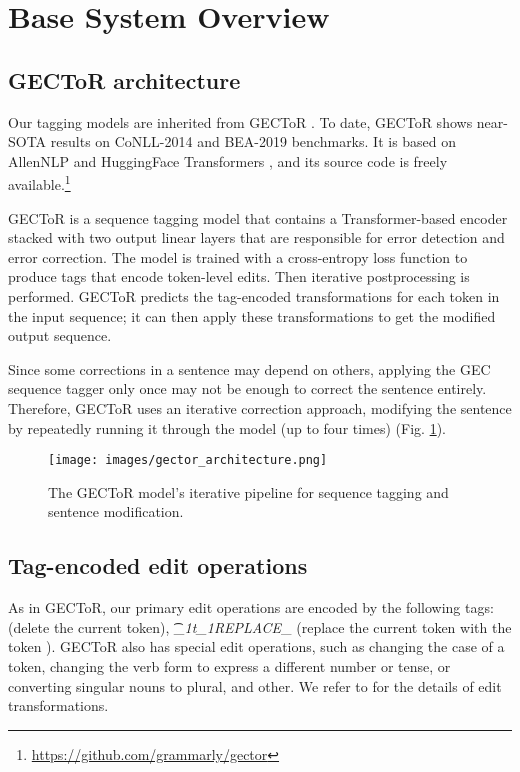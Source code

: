 \documentclass[11pt]{article}
\begin{document}
\section{Base System Overview}
\subsection{GECToR architecture} 
Our tagging models are inherited from GECToR \cite{omelianchuk2020gector}. To date, GECToR shows near-SOTA results on CoNLL-2014 and BEA-2019 benchmarks. It is based on AllenNLP \cite{Gardner2017AllenNLP} and  HuggingFace Transformers \cite{wolf2019huggingface}, and its source code is freely available.\footnote{\url{https://github.com/grammarly/gector}}

GECToR is a sequence tagging model that contains a Transformer-based encoder stacked with two output linear layers that are responsible for error detection and error correction. The model is trained with a cross-entropy loss function to produce tags that encode token-level edits. Then iterative postprocessing is performed. GECToR predicts the tag-encoded transformations for each token in the input sequence; it can then apply these transformations to get the modified output sequence. 

Since some corrections in a sentence may depend on others, applying the GEC sequence tagger only once may not be enough to correct the sentence entirely. Therefore, GECToR uses an iterative correction approach, modifying  the sentence by repeatedly running it through the model (up to four times) (Fig. \ref{fig_gector}).

\begin{figure}[!h]
\centering
\texttt{[image: images/gector\_architecture.png]} 
\caption{The GECToR model's iterative pipeline for sequence tagging and sentence modification.} \label{fig_gector}
\end{figure}

\subsection{Tag-encoded edit operations} As in GECToR, our primary edit operations are encoded by the following tags: \textit{\DELETE} (delete the current token), \textit{\t_{1}t_{1}REPLACE}\_  (replace the current token with the token ). GECToR also has special edit operations, such as changing the case of a token, changing the verb form to express a different number or tense, or converting singular nouns to plural, and other.  We refer to \cite{omelianchuk2020gector} for the details of edit transformations.
\end{document}
